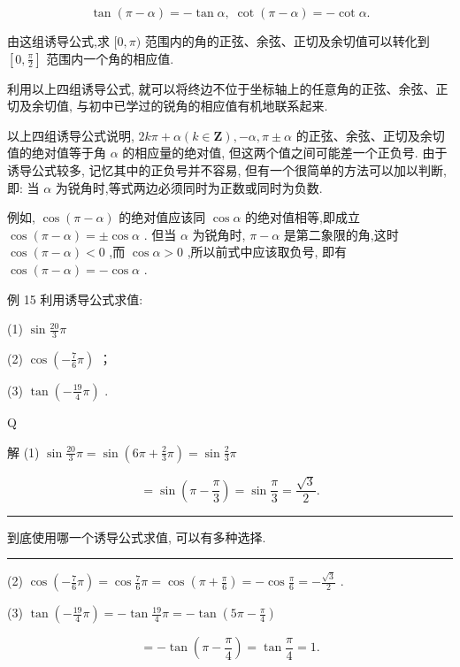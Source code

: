 \documentclass[10pt]{article}
\newcommand{\HRule}{\begin{center}\rule{0.9\linewidth}{0.2mm}\end{center}}
\begin{document}
\[
\tan \left( {\pi  - \alpha }\right)  =  - \tan \alpha ,\;\cot \left( {\pi  - \alpha }\right)  =  - \cot \alpha .
\]

由这组诱导公式,求 \(\lbrack 0,\pi )\) 范围内的角的正弦、余弦、正切及余切值可以转化到 \(\left\lbrack  {0,\frac{\pi }{2}}\right\rbrack\) 范围内一个角的相应值.

利用以上四组诱导公式, 就可以将终边不位于坐标轴上的任意角的正弦、余弦、正切及余切值, 与初中已学过的锐角的相应值有机地联系起来.

以上四组诱导公式说明, \({2k\pi } + \alpha \left( {k \in  \mathbf{Z}}\right) , - \alpha ,\pi  \pm  \alpha\) 的正弦、余弦、正切及余切值的绝对值等于角 \(\alpha\) 的相应量的绝对值, 但这两个值之间可能差一个正负号. 由于诱导公式较多, 记忆其中的正负号并不容易, 但有一个很简单的方法可以加以判断, 即: 当 \(\alpha\) 为锐角时,等式两边必须同时为正数或同时为负数.

例如, \(\cos \left( {\pi  - \alpha }\right)\) 的绝对值应该同 \(\cos \alpha\) 的绝对值相等,即成立 \(\cos \left( {\pi  - \alpha }\right)  =  \pm  \cos \alpha\) . 但当 \(\alpha\) 为锐角时, \(\pi  - \alpha\) 是第二象限的角,这时 \(\cos \left( {\pi  - \alpha }\right)  < 0\) ,而 \(\cos \alpha  > 0\) ,所以前式中应该取负号, 即有 \(\cos \left( {\pi  - \alpha }\right)  =  - \cos \alpha\) .

例 15 利用诱导公式求值:

(1) \(\sin \frac{20}{3}\pi\)

(2) \(\cos \left( {-\frac{7}{6}\pi }\right)\) ；

(3) \(\tan \left( {-\frac{19}{4}\pi }\right)\) .

Q

解 (1) \(\sin \frac{20}{3}\pi  = \sin \left( {{6\pi } + \frac{2}{3}\pi }\right)  = \sin \frac{2}{3}\pi\)

\[
= \sin \left( {\pi  - \frac{\pi }{3}}\right)  = \sin \frac{\pi }{3} = \frac{\sqrt{3}}{2}.
\]

\HRule

到底使用哪一个诱导公式求值, 可以有多种选择.

\HRule

(2) \(\cos \left( {-\frac{7}{6}\pi }\right)  = \cos \frac{7}{6}\pi  = \cos \left( {\pi  + \frac{\pi }{6}}\right)  =  - \cos \frac{\pi }{6} =  - \frac{\sqrt{3}}{2}\) .

(3) \(\tan \left( {-\frac{19}{4}\pi }\right)  =  - \tan \frac{19}{4}\pi  =  - \tan \left( {{5\pi } - \frac{\pi }{4}}\right)\)

\[
=  - \tan \left( {\pi  - \frac{\pi }{4}}\right)  = \tan \frac{\pi }{4} = 1.
\]
\end{document}
